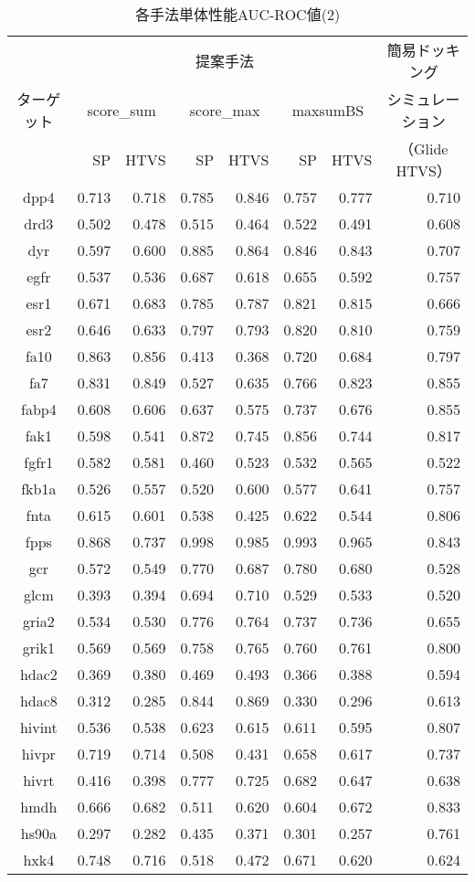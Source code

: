 \clearpage
\begin{table}[t] \centering
	\caption{各手法単体性能AUC-ROC値(2)}
	\label{table:auc:2}
	\begin{tabular}{c|rrrrrr|r}
	\hline
		&\multicolumn{6}{c|}{提案手法}&\multicolumn{1}{c}{簡易ドッキング} \\
ターゲット	&\multicolumn{2}{c}{score\_sum}&\multicolumn{2}{c}{score\_max}&\multicolumn{2}{c|}{maxsumBS}&\multicolumn{1}{c}{シミュレーション} \\
		&SP&HTVS&SP&HTVS&SP&HTVS&\multicolumn{1}{c}{（Glide HTVS）} \\
\hline
dpp4&0.713&0.718&0.785&0.846&0.757&0.777&0.710 \\
drd3&0.502&0.478&0.515&0.464&0.522&0.491&0.608 \\
dyr&0.597&0.600&0.885&0.864&0.846&0.843&0.707 \\
egfr&0.537&0.536&0.687&0.618&0.655&0.592&0.757 \\
esr1&0.671&0.683&0.785&0.787&0.821&0.815&0.666 \\
esr2&0.646&0.633&0.797&0.793&0.820&0.810&0.759 \\
fa10&0.863&0.856&0.413&0.368&0.720&0.684&0.797 \\
fa7&0.831&0.849&0.527&0.635&0.766&0.823&0.855 \\
fabp4&0.608&0.606&0.637&0.575&0.737&0.676&0.855 \\
fak1&0.598&0.541&0.872&0.745&0.856&0.744&0.817 \\
fgfr1&0.582&0.581&0.460&0.523&0.532&0.565&0.522 \\
fkb1a&0.526&0.557&0.520&0.600&0.577&0.641&0.757 \\
fnta&0.615&0.601&0.538&0.425&0.622&0.544&0.806 \\
fpps&0.868&0.737&0.998&0.985&0.993&0.965&0.843 \\
gcr&0.572&0.549&0.770&0.687&0.780&0.680&0.528 \\
glcm&0.393&0.394&0.694&0.710&0.529&0.533&0.520 \\
gria2&0.534&0.530&0.776&0.764&0.737&0.736&0.655 \\
grik1&0.569&0.569&0.758&0.765&0.760&0.761&0.800 \\
hdac2&0.369&0.380&0.469&0.493&0.366&0.388&0.594 \\
hdac8&0.312&0.285&0.844&0.869&0.330&0.296&0.613 \\
hivint&0.536&0.538&0.623&0.615&0.611&0.595&0.807 \\
hivpr&0.719&0.714&0.508&0.431&0.658&0.617&0.737 \\
hivrt&0.416&0.398&0.777&0.725&0.682&0.647&0.638 \\
hmdh&0.666&0.682&0.511&0.620&0.604&0.672&0.833 \\
hs90a&0.297&0.282&0.435&0.371&0.301&0.257&0.761 \\
hxk4&0.748&0.716&0.518&0.472&0.671&0.620&0.624 \\
\hline
	\end{tabular}
\end{table}
